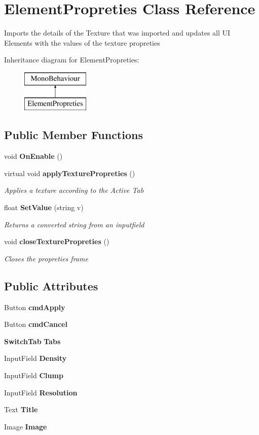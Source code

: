 \section{Element\+Propreties Class Reference}
\label{class_element_propreties}


Imports the details of the Texture that was imported and updates all UI Elements with the values of the texture propreties  


Inheritance diagram for Element\+Propreties\+:\begin{figure}[H]
\begin{center}
\leavevmode
\includegraphics[height=2.000000cm]{class_element_propreties}
\end{center}
\end{figure}
\subsection*{Public Member Functions}
\begin{DoxyCompactItemize}
\item 
void \textbf{ On\+Enable} ()
\item 
virtual void \textbf{ apply\+Texture\+Propreties} ()
\begin{DoxyCompactList}\small\item\em Applies a texture according to the Active Tab \end{DoxyCompactList}\item 
float \textbf{ Set\+Value} (string v)
\begin{DoxyCompactList}\small\item\em Returns a converted string from an inputfield \end{DoxyCompactList}\item 
void \textbf{ close\+Texture\+Propreties} ()
\begin{DoxyCompactList}\small\item\em Closes the propreties frame \end{DoxyCompactList}\end{DoxyCompactItemize}
\subsection*{Public Attributes}
\begin{DoxyCompactItemize}
\item 
Button \textbf{ cmd\+Apply}
\item 
Button \textbf{ cmd\+Cancel}
\item 
\textbf{ Switch\+Tab} \textbf{ Tabs}
\item 
Input\+Field \textbf{ Density}
\item 
Input\+Field \textbf{ Clump}
\item 
Input\+Field \textbf{ Resolution}
\item 
Text \textbf{ Title}
\item 
Image \textbf{ Image}
\end{DoxyCompactItemize}
